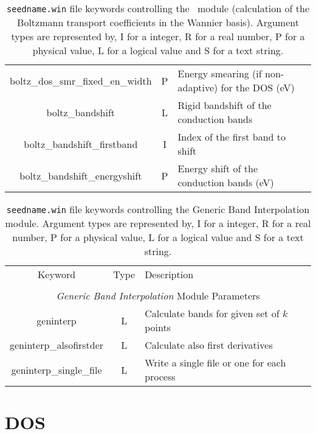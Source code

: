 \begin{table}[hH!]
\begin{center}
\begin{tabular}{|c|c|p{6cm}|}
{\sc boltz\_dos\_smr\_fixed\_en\_width} & P  & Energy smearing (if non-adaptive) for the DOS (eV) \\
{\sc boltz\_bandshift} & L & Rigid bandshift of the conduction bands\\
{\sc boltz\_bandshift\_firstband} & I & Index of the first band to shift\\
{\sc boltz\_bandshift\_energyshift} & P & Energy shift of the conduction bands (eV)\\
\hline
\end{tabular}
\caption[Parameter file keywords controlling the \bw\ module.]
{{\tt seedname.win} file keywords controlling the \bw\ module (calculation of the Boltzmann transport coefficients in the Wannier basis). Argument types
are represented by, I for a integer, R for a real number, P for a
physical value, L for a logical value and S for a text string.}
\label{parameter_keywords_bw}
\end{center}
\end{table}

\begin{table}[hH!]
\begin{center}
\begin{tabular}{|c|c|p{6cm}|}
\hline
Keyword & Type & Description \\
        &      &             \\
\hline\hline
\multicolumn{3}{|c|}{\emph{Generic Band Interpolation} Module Parameters} \\
\hline
{\sc geninterp}   & L & Calculate bands for given set of $k$ points \\
{\sc geninterp\_alsofirstder} & L & Calculate also first derivatives\\ 
{\sc geninterp\_single\_file} & L & Write a single file or one for each
process\\ 
\hline
\end{tabular}
\caption[Parameter file keywords controlling the Generic Band Interpolation module.]
{{\tt seedname.win} file keywords controlling the Generic Band Interpolation module. Argument types
are represented by, I for a integer, R for a real number, P for a
physical value, L for a logical value and S for a text string.}
\label{parameter_keywords_geninterp}
\end{center}
\end{table}

\clearpage
\section{DOS}

